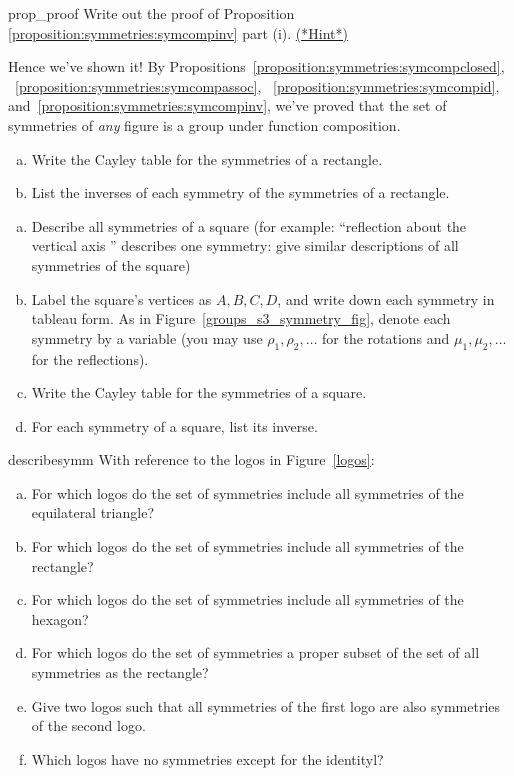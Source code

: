 \begin{exercise}{prop_proof}
Write out the proof of Proposition \ref{proposition:symmetries:symcompinv} part (i).
\hyperref[sec:symmetries:hints]{(*Hint*)}
\end{exercise}

\bigskip
Hence we've shown it!  By Propositions~\ref{proposition:symmetries:symcompclosed}, ~\ref{proposition:symmetries:symcompassoc}, ~\ref{proposition:symmetries:symcompid}, and~\ref{proposition:symmetries:symcompinv}, we've proved that the set of symmetries of \emph{any} figure is a group under function composition.

\bigskip
\begin{exercise}{}
\begin{enumerate}[(a)]
\item
Write the Cayley table for the symmetries of a rectangle.
\item
List the inverses of each symmetry of the symmetries of a rectangle.
\end{enumerate}
\end{exercise}

\begin{exercise}{}
\begin{enumerate}[(a)]
\item
Describe all symmetries of a square  (for example: ``reflection about the vertical axis '' describes one symmetry: give similar descriptions of all symmetries of the square)
\item
Label the square's vertices as $A, B, C, D$, and write down each symmetry in tableau form. As in Figure~\ref{groups_s3_symmetry_fig}, denote each symmetry by a variable (you may use $\rho_1, \rho_2, \ldots$ for the rotations and $\mu_1, \mu_2, \ldots$ for the reflections).
\item
Write the Cayley table for the symmetries of a square.
\item
For each symmetry of a square, list its inverse.
\end{enumerate}
\end{exercise}

\begin{exercise}{describesymm}
With reference to the logos in Figure~\ref{logos}:
\begin{enumerate}[(a)]
\item
For which logos do the set of symmetries include all symmetries of the equilateral triangle?
\item
For which logos do the set of symmetries include all symmetries of the rectangle?
\item
For which logos do the set of symmetries include all symmetries of the hexagon?
\item
For which logos do the set of symmetries a proper subset of the set of all symmetries as the rectangle?
\item
Give two logos such that all symmetries of the first logo are also symmetries of the second logo.
\item
Which logos have no symmetries except for the identityl?
\end{enumerate}
\end{exercise}  

